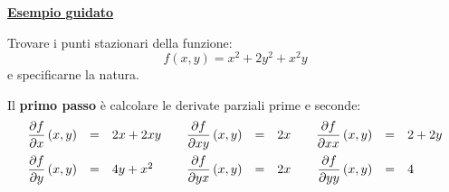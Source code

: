 \documentclass[a4paper]{article}
\newcommand{\example}[1]{\textcolor{Green4}{\textbf{#1}}}
\begin{document}
	\begin{flushleft}
		\example{\underline{Esempio guidato}}
	\end{flushleft}
	Trovare i punti stazionari della funzione:
	\begin{equation*}
		f\left(x,y\right) = x^{2} + 2y^{2} + x^{2}y
	\end{equation*}
	e specificarne la natura.\newline

	\noindent
	Il \textbf{primo passo} è calcolare le derivate parziali prime e seconde:
	\begin{equation*}
		\begin{array}{rcl c rcl c rcl}
			\dfrac{\partial f}{\partial x}\left(x,y\right) &=& 2x + 2xy &&
			\dfrac{\partial f}{\partial xy}\left(x,y\right) &=& 2x &&
			\dfrac{\partial f}{\partial xx}\left(x,y\right) &=& 2 + 2y \\ [1em]
			\dfrac{\partial f}{\partial y}\left(x,y\right) &=& 4y + x^{2} &&
			\dfrac{\partial f}{\partial yx}\left(x,y\right) &=& 2x &&
			\dfrac{\partial f}{\partial yy}\left(x,y\right) &=& 4  \\ [1em]
		\end{array}
	\end{equation*}
\end{document}
